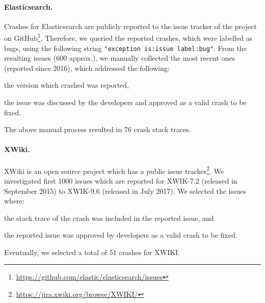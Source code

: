 \paragraph{Elasticsearch.}
%
Crashes for Elasticsearch are publicly reported to the issue tracker of the project on GitHub\footnote{\url{https://github.com/elastic/elasticsearch/issues}}.
Therefore, we queried the reported crashes, which were labelled as bugs, using the following string \texttt{"exception is:issue label:bug"}.
From the resulting issues ($600$ approx.), we manually collected the most recent ones (reported since 2016), which addressed the following:
\begin{inparaenum}[(i)]
\item the version which crashed was reported,
\item the issue was discussed by the developers and approved as a valid crash to be fixed.
\end{inparaenum}
The above manual process resulted in 76 crash stack traces.

\paragraph{XWiki.}
%
XWiki is an open source project which has a public issue tracker\footnote{\url{https://jira.xwiki.org/browse/XWIKI/}}.
We investigated first 1000 issues which are reported for XWIK-7.2 (released in September 2015) to XWIK-9.6 (released in July 2017).
We selected the issues where:
\begin{inparaenum}[(i)]
\item the stack trace of the crash was included in the reported issue, and
\item the reported issue was approved by developers as a valid crash to be fixed.
\end{inparaenum}
Eventually, we selected a total of 51 crashes for XWIKI.

